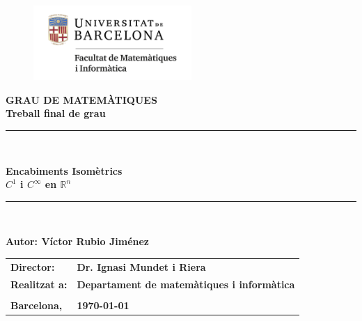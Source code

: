 \documentclass[11pt,a4paper,openright,oneside]{book}
\numberwithin{equation}{section}
\theoremstyle{definition}
\begin{document}

\thispagestyle{empty}

\begin{titlepage}
\begin{center}
\begin{figure}[htb]
\begin{center}
\includegraphics[width=6cm]{matematiquesinformatica-pos-rgb.png}
\end{center}
\end{figure}

\vspace*{1cm}
\textbf{\LARGE GRAU DE MATEM\`{A}TIQUES } \\
\vspace*{.5cm}
\textbf{\LARGE Treball final de grau} \\

\vspace*{1.5cm}
\rule{16cm}{0.1mm}\\
\begin{Huge}
\textbf{Encabiments Isomètrics\\ $C^1$ i $C^\infty$ en $\mathbb R^n$} \\
\end{Huge}
\rule{16cm}{0.1mm}\\

\vspace{1cm}

\begin{flushright}
\textbf{\LARGE Autor: Víctor Rubio Jiménez}

\vspace*{2cm}

\renewcommand{\arraystretch}{1.5}
\begin{tabular}{ll}
\textbf{\Large Director:} & \textbf{\Large Dr. Ignasi Mundet i Riera } \\
\textbf{\Large Realitzat a:} & \textbf{\Large  Departament de matemàtiques i informàtica   } \\
\\
\textbf{\Large Barcelona,} & \textbf{\Large \today }
\end{tabular}
\end{flushright}
\end{center}
\end{titlepage}
\end{document}
